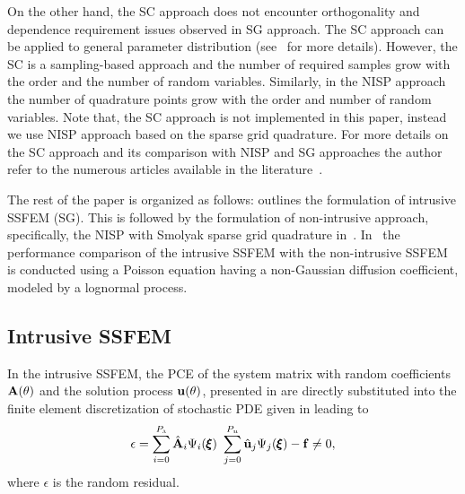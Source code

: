 \documentclass[letter,1p,11pt,oneside,onecolumn,sort&compress]{elsarticle}
\begin{document}
On the other hand, the SC approach does not encounter orthogonality and dependence requirement issues observed in SG approach. The SC approach can be applied to general parameter distribution (see~\cite{eldred2009comparison,smith2013uncertainty} for more details). However, the SC is a sampling-based approach and the number of required samples grow with the order and the number of random variables. Similarly, in the NISP approach the number of quadrature points grow with the order and number of random variables.
Note that, the SC approach is not implemented in this paper, instead we use NISP approach based on the sparse grid quadrature.
For more details on the SC approach and its comparison with NISP and SG approaches the author refer to the numerous articles available in the literature~\cite{babuvska2007stochastic,xiu2007efficient,ganapathysubramanian2007sparse,nobile2008sparse,eldred2009comparison,smith2013uncertainty}.


The rest of the paper is organized as follows:  outlines the formulation of intrusive SSFEM (SG).
This is followed by the formulation of non-intrusive approach, specifically, the NISP with Smolyak sparse grid quadrature in~.
In~ the performance comparison of the intrusive SSFEM with the non-intrusive SSFEM is conducted using a Poisson equation having a non-Gaussian diffusion coefficient, modeled by a lognormal process.





\subsection{Intrusive SSFEM} \label{sec:IN}
In the intrusive SSFEM, the PCE of the system matrix with random coefficients ${\mathrm{\bf{A}(\theta)}}$ and the solution process ${\mathrm{\bf{u}(\theta)}}$, presented in  are directly substituted into the finite element discretization of stochastic PDE given in  leading to~\cite{ghanemSFEM1991}
\begin{equation}
\epsilon = \sum^{P_{\textsc{a}}}_{i=0} {\hat{{\mathrm{\bf{A}}}}_i} {\Psi_i({\pmb{\xi}})}
\ \sum^{P_{u}}_{j=0} {\mathrm{\hat{\bf{u}}}_j} {\Psi_j({\pmb{\xi}})} - {\mathrm{\bf{f}}} \neq 0,
\label{eq:skuf}
\end{equation}
where $\epsilon$ is the random residual.
\end{document}
